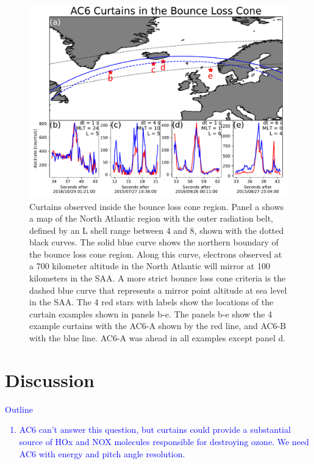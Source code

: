 \documentclass[draft]{agujournal2019}
\begin{document}
\begin{figure}
\includegraphics[width=\textwidth]{fig3.pdf}
\caption{Curtains observed inside the bounce loss cone region. Panel a shows a map of the North Atlantic region with the outer radiation belt, defined by an L shell range between 4 and 8, shown with the dotted black curves. The solid blue curve shows the northern boundary of the bounce loss cone region. Along this curve, electrons observed at a 700 kilometer altitude in the North Atlantic will mirror at 100 kilometers in the SAA. A more strict bounce loss cone criteria is the dashed blue curve that represents a mirror point altitude at sea level in the SAA. The 4 red stars with labels show the locations of the curtain examples shown in panels b-e. The panels b-e show the 4 example curtains with the AC6-A shown by the red line, and AC6-B with the blue line. AC6-A was ahead in all examples except panel d.}
\label{fig3}
\end{figure}

\section{Discussion} \label{discussion}
\textcolor{blue}{
Outline
\begin{enumerate}
\item AC6 can't answer this question, but curtains could provide a substantial source of HOx and NOX molecules responsible for destroying ozone. We need AC6 with energy and pitch angle resolution.
\end{enumerate}}
\end{document}
